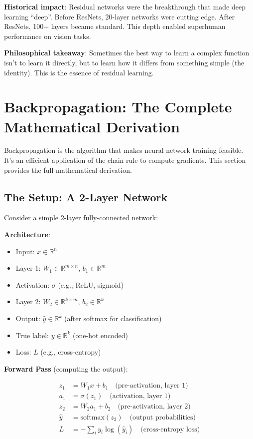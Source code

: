 \textbf{Historical impact}: Residual networks were the breakthrough that made deep learning ``deep''. Before ResNets, 20-layer networks were cutting edge. After ResNets, 100+ layers became standard. This depth enabled superhuman performance on vision tasks.

\textbf{Philosophical takeaway}: Sometimes the best way to learn a complex function isn't to learn it directly, but to learn how it differs from something simple (the identity). This is the essence of residual learning.

\section{Backpropagation: The Complete Mathematical Derivation}

Backpropagation is the algorithm that makes neural network training feasible. It's an efficient application of the chain rule to compute gradients. This section provides the full mathematical derivation.

\subsection{The Setup: A 2-Layer Network}

Consider a simple 2-layer fully-connected network:

\textbf{Architecture}:
\begin{itemize}
\item Input: $x \in \mathbb{R}^n$
\item Layer 1: $W_1 \in \mathbb{R}^{m \times n}$, $b_1 \in \mathbb{R}^m$
\item Activation: $\sigma$ (e.g., ReLU, sigmoid)
\item Layer 2: $W_2 \in \mathbb{R}^{k \times m}$, $b_2 \in \mathbb{R}^k$
\item Output: $\hat{y} \in \mathbb{R}^k$ (after softmax for classification)
\item True label: $y \in \mathbb{R}^k$ (one-hot encoded)
\item Loss: $L$ (e.g., cross-entropy)
\end{itemize}

\textbf{Forward Pass} (computing the output):

\begin{align*}
z_1 &= W_1 x + b_1 \quad \text{(pre-activation, layer 1)} \\
a_1 &= \sigma(z_1) \quad \text{(activation, layer 1)} \\
z_2 &= W_2 a_1 + b_2 \quad \text{(pre-activation, layer 2)} \\
\hat{y} &= \text{softmax}(z_2) \quad \text{(output probabilities)} \\
L &= -\sum_i y_i \log(\hat{y}_i) \quad \text{(cross-entropy loss)}
\end{align*}

